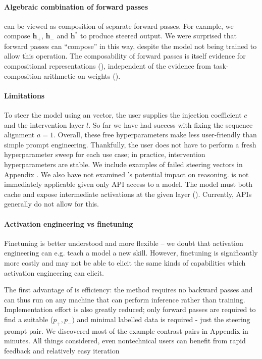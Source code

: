 \documentclass{article}
\newcommand{\shortmethod}{\text{ActAdd}}
\theoremstyle{plain}
\theoremstyle{definition}
\theoremstyle{remark}
\begin{document}
\paragraph{Algebraic combination of forward passes} {\shortmethod} can be viewed as composition of separate forward passes. For example, we compose $\mathbf{h}_+$, $\mathbf{h}_-$ and $\mathbf{h}^*$ to produce steered output. We were surprised that forward passes can ``compose'' in this way, despite the model not being trained to allow this operation. The composability of forward passes is itself evidence for compositional representations (\cite{composit}), independent of the evidence from task-composition arithmetic on weights (\cite{ilharco2023editing}). 

\paragraph{Limitations} To steer the model using an {\shortmethod} vector, the user supplies the injection coefficient $c$ and the intervention layer $l$. So far we have had success with fixing the sequence alignment $a=1$. Overall, these free hyperparameters make {\shortmethod} less user-friendly than simple prompt engineering. Thankfully, the user does not have to perform a fresh hyperparameter sweep for each use case; in practice, intervention hyperparameters are stable. 
% 
We include examples of failed steering vectors in Appendix . We also have not examined {\shortmethod}'s potential impact on reasoning.
% 
{\shortmethod} is not immediately applicable given only API access to a model. The model must both cache and expose intermediate activations at the given layer (\citealt{lens}). Currently, APIs generally do not allow for this.

\paragraph{Activation engineering vs finetuning}
Finetuning is better understood and more flexible -- we doubt that activation engineering can e.g. teach a model a new skill. However, finetuning is significantly more costly and may not be able to elicit the same kinds of capabilities which activation engineering can elicit.

The first advantage of {\shortmethod} is efficiency: the method requires no backward passes and can thus run on any machine that can perform inference rather than training. Implementation effort is also greatly reduced; only forward passes are required to find a suitable ($p_+, p_-)$ and minimal labelled data is required - just the steering prompt pair. We discovered most of the example contrast pairs in Appendix  in minutes. All things considered, even nontechnical users can benefit from rapid feedback and relatively easy iteration
\end{document}
